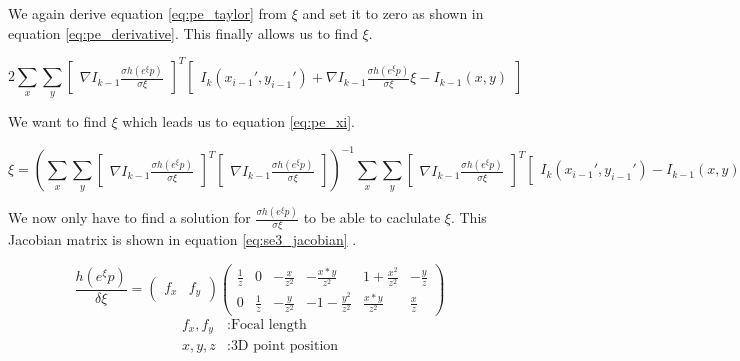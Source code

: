 \documentclass[11pt,a4paper,titlepage,oneside]{report}
\begin{document}
We again derive equation \ref{eq:pe_taylor} from $\xi$ and set it to zero as shown in equation \ref{eq:pe_derivative}. This finally allows us to find $\xi$.

\begin{equation}\label{eq:pe_derivative}
  2\sum_x\sum_y\begin{bmatrix}\nabla I_{k-1}\frac{\sigma h(e^{\xi}p)}{\sigma \xi}\end{bmatrix}^T\begin{bmatrix}I_{k}(x_{i-1}',y_{i-1}')+\nabla I_{k-1}\frac{\sigma h(e^{\xi} p)}{\sigma \xi}\xi-I_{k-1}(x,y)\end{bmatrix}
\end{equation}

We want to find $\xi$ which leads us to equation \ref{eq:pe_xi}.

\tiny
\begin{equation}\label{eq:pe_xi}
  \xi=(\sum_x\sum_y\begin{bmatrix}\nabla I_{k-1}\frac{\sigma h(e^{\xi}p)}{\sigma \xi}\end{bmatrix}^T\begin{bmatrix}\nabla I_{k-1}\frac{\sigma h(e^{\xi}p)}{\sigma \xi}\end{bmatrix})^{-1}
  \sum_x\sum_y\begin{bmatrix}\nabla I_{k-1}\frac{\sigma h(e^{\xi}p)}{\sigma \xi}\end{bmatrix}^T\begin{bmatrix}I_{k}(x_{i-1}',y_{i-1}') - I_{k-1}(x,y)\end{bmatrix}
\end{equation}
\normalsize

We now only have to find a solution for $\frac{\sigma h(e^{\xi}p)}{\sigma \xi}$ to be able to caclulate $\xi$. This Jacobian matrix is shown in equation \ref{eq:se3_jacobian} \cite{se3_explain}.

\begin{equation}\label{eq:se3_jacobian}
  \frac{h(e^{\xi}p)}{\delta \xi}=
  \begin{pmatrix}
    f_x & f_y
  \end{pmatrix}
  \begin{pmatrix}
    \frac{1}{z} & 0 & -\frac{x}{z^2} & -\frac{x*y}{z^2} & 1 + \frac{x^2}{z^2} & -\frac{y}{z} \\
    0 & \frac{1}{z}  & -\frac{y}{z^2} & -1 - \frac{y^2}{z^2} & \frac{x*y}{z^2} &  \frac{x}{z}
  \end{pmatrix}
\end{equation}
\begin{align*}
  f_x,f_y  &:  \text{Focal length}\\
  x,y,z    &:  \text{3D point position}\\
\end{align*}
\end{document}
